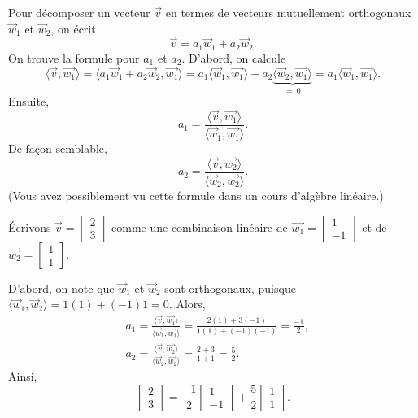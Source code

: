 Pour décomposer un vecteur $\vec{v}$ en termes de vecteurs mutuellement orthogonaux  $\vec{w}_1$ et $\vec{w}_2$, on écrit
\begin{equation*}
\vec{v} = a_1 \vec{w}_1  + a_2 \vec{w}_2 .
\end{equation*}
On trouve la formule pour $a_1$ et $a_2$. D'abord, on calcule 
\begin{equation*}
\langle \vec{v} , \vec{w_1} \rangle
=
\langle a_1 \vec{w}_1  + a_2 \vec{w}_2 , \vec{w_1} \rangle
=
a_1 \langle \vec{w}_1 , \vec{w_1} \rangle
+
a_2 \underbrace{\langle \vec{w}_2 , \vec{w_1} \rangle}_{=~0}
=
a_1 \langle \vec{w}_1 , \vec{w_1} \rangle .
\end{equation*}
Ensuite,
\begin{equation*}
a_1 = 
\frac{\langle \vec{v} , \vec{w_1} \rangle}{
\langle \vec{w}_1 , \vec{w_1} \rangle} .
\end{equation*}
De façon semblable,
\begin{equation*}
a_2 = 
\frac{\langle \vec{v} , \vec{w_2} \rangle}{
\langle \vec{w}_2 , \vec{w_2} \rangle} .
\end{equation*}
(Vous avez possiblement vu cette formule dans un cours d'algèbre linéaire.)

\begin{example}
Écrivons 
$\vec{v} = \left[ \begin{smallmatrix} 2 \\ 3 \end{smallmatrix} \right]$
comme une combinaison linéaire de 
$\vec{w_1} = \left[ \begin{smallmatrix} 1 \\ -1 \end{smallmatrix} \right]$
et de
$\vec{w_2} = \left[ \begin{smallmatrix} 1 \\ 1 \end{smallmatrix} \right]$.

D'abord, on note que $\vec{w}_1$ et $\vec{w}_2$ sont orthogonaux, puisque 
 $\langle \vec{w}_1 , \vec{w}_2 \rangle = 1(1) + (-1)1 = 0$.
Alors,
\begin{align*}
& a_1 = 
\frac{\langle \vec{v} , \vec{w_1} \rangle}{
\langle \vec{w}_1 , \vec{w_1} \rangle}
=
\frac{2(1) + 3(-1)}{1(1) + (-1)(-1)} = \frac{-1}{2} ,
\\
& a_2 = 
\frac{\langle \vec{v} , \vec{w_2} \rangle}{
\langle \vec{w}_2 , \vec{w_2} \rangle}
=
\frac{2 + 3}{1 + 1} = \frac{5}{2} .
\end{align*}
Ainsi,
\begin{equation*}
\begin{bmatrix} 2 \\ 3 \end{bmatrix}
=
\frac{-1}{2}
\begin{bmatrix} 1 \\ -1 \end{bmatrix}
+
\frac{5}{2}
\begin{bmatrix} 1 \\ 1 \end{bmatrix} .
\end{equation*}
\end{example}

